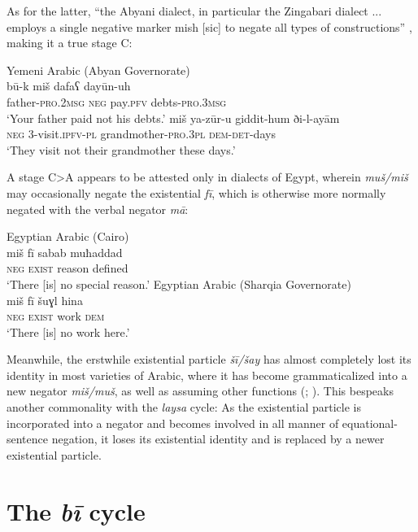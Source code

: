 \documentclass[output=paper]{langsci/langscibook}
\begin{document}
As for the latter, “the Abyani dialect, in particular the Zingabari dialect ... employs a single negative marker mish [sic] to negate all types of constructions” \citep[33]{ahmed2012}, making it a true stage C:

\ea Yemeni Arabic (Abyan Governorate)\label{ex:WiAR-20}\\
  \ea
  	\gll bū-k miš dafaʕ dayūn-uh\\
  	father-\textsc{pro.2msg} \textsc{neg} pay.\textsc{pfv} debts-\textsc{pro.3msg} \\
  	\glt ‘Your father paid not his debts.’ \citep[35]{ahmed2012}
  \ex
  	\gll miš ya-zūr-u giddit-hum ði-l-ayām\\
  	\textsc{neg} 3-visit.\textsc{ipfv-pl} grandmother-\textsc{pro.3pl} \textsc{dem-det}-days\\
  	\glt ‘They visit not their grandmother these days.’ \citep[38]{ahmed2012} 
\z \z

A stage C>A appears to be attested only in dialects of Egypt, wherein \textit{muš/miš} may occasionally negate the existential \textit{fī}, which is otherwise more normally negated with the verbal negator \textit{mā}:

\ea \label{ex:WiAR-21}
  \ea Egyptian Arabic (Cairo)\\
  	\gll miš fī sabab muħaddad\\
  	\textsc{neg} \textsc{exist} reason defined\\
  	\glt ‘There [is] no special reason.’ \citep[89]{doss2008a}
  \ex Egyptian Arabic (Sharqia Governorate)\\
  	\gll miš fī šuɣ⁠l hina\\
  	\textsc{neg} \textsc{exist} work \textsc{dem}\\
  	\glt ‘There [is] no work here.’ \citep[71]{h2011a}
\z \z


Meanwhile, the erstwhile existential particle \textit{šī/šay} has almost completely lost its identity in most varieties of Arabic, where it has become grammaticalized into a new negator \textit{miš/muš}, as well as assuming other functions (\citealp[chpt. 3]{wilmsen2014a}; \citealp{wilmsen2017a}). This bespeaks another commonality with the \textit{laysa} cycle: As the existential particle is incorporated into a negator and becomes involved in all manner of equational-sentence negation, it loses its existential identity and is replaced by a newer existential particle. 


\section{The \textit{bī} cycle} \label{s:WiAR-4}
\end{document}
